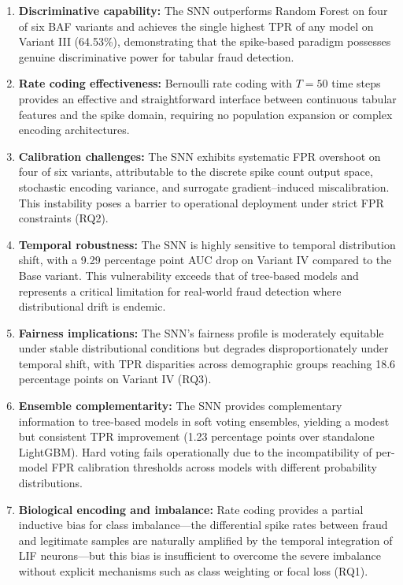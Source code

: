 \begin{enumerate}
\item \textbf{Discriminative capability:} The SNN outperforms Random Forest on four of six BAF variants and achieves the single highest TPR of any model on Variant III (64.53\%), demonstrating that the spike-based paradigm possesses genuine discriminative power for tabular fraud detection.

\item \textbf{Rate coding effectiveness:} Bernoulli rate coding with $T = 50$ time steps provides an effective and straightforward interface between continuous tabular features and the spike domain, requiring no population expansion or complex encoding architectures.

\item \textbf{Calibration challenges:} The SNN exhibits systematic FPR overshoot on four of six variants, attributable to the discrete spike count output space, stochastic encoding variance, and surrogate gradient--induced miscalibration. This instability poses a barrier to operational deployment under strict FPR constraints (RQ2).

\item \textbf{Temporal robustness:} The SNN is highly sensitive to temporal distribution shift, with a 9.29 percentage point AUC drop on Variant IV compared to the Base variant. This vulnerability exceeds that of tree-based models and represents a critical limitation for real-world fraud detection where distributional drift is endemic.

\item \textbf{Fairness implications:} The SNN's fairness profile is moderately equitable under stable distributional conditions but degrades disproportionately under temporal shift, with TPR disparities across demographic groups reaching 18.6 percentage points on Variant IV (RQ3).

\item \textbf{Ensemble complementarity:} The SNN provides complementary information to tree-based models in soft voting ensembles, yielding a modest but consistent TPR improvement (1.23 percentage points over standalone LightGBM). Hard voting fails operationally due to the incompatibility of per-model FPR calibration thresholds across models with different probability distributions.

\item \textbf{Biological encoding and imbalance:} Rate coding provides a partial inductive bias for class imbalance---the differential spike rates between fraud and legitimate samples are naturally amplified by the temporal integration of LIF neurons---but this bias is insufficient to overcome the severe imbalance without explicit mechanisms such as class weighting or focal loss (RQ1).
\end{enumerate}

